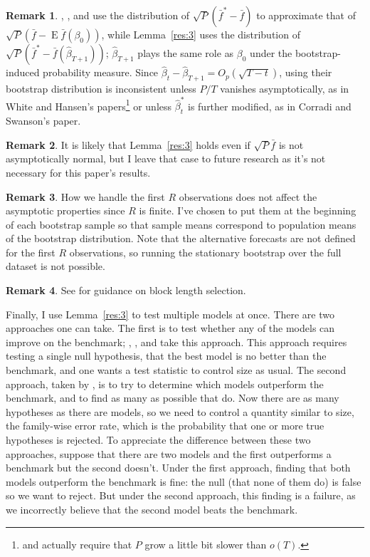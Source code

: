 \documentclass[12pt]{article}
\theoremstyle{definition}
\newtheorem{rem}{Remark}
\DeclareMathOperator{\E}{E}
\begin{document}
\begin{rem}
  \citet{Whi:00}, \citet{Han:05}, and \citet{CoS:07} use the
  distribution of $\sqrt{P}(\bar{f}^{*} - \bar{f})$ to approximate
  that of $\sqrt{P}(\bar{f} - \E \bar{f}(\beta_0))$, while
  Lemma~\ref{res:3} uses the distribution of $\sqrt{P}(\bar{f}^{*} -
  \bar{f}(\hat{\beta}_{T+1}))$; $\hat{\beta}_{T+1}$ plays the same
  role as $\beta_0$ under the bootstrap-induced probability measure.
  Since $\hat{\beta}_t - \hat{\beta}_{T+1} = O_p(\sqrt{T-t})$, using
  their bootstrap distribution is inconsistent unless $P/T$ vanishes
  asymptotically, as in White and Hansen's
  papers\footnote{\citet{Whi:00} and \citet{Han:05} actually require
    that $P$ grow a little bit slower than $o(T)$.} or unless
  $\hat{\beta}_t^{*}$ is further modified, as in Corradi and Swanson's
  paper.
\end{rem}

\begin{rem}
  It is likely that Lemma~\ref{res:3} holds even if $\sqrt{P} \bar{f}$
  is not asymptotically normal, but I leave that case to future
  research as it's not necessary for this paper's results.
\end{rem}

\begin{rem}
  How we handle the first $R$ observations does not affect the
  asymptotic properties since $R$ is finite.  I've chosen to put them
  at the beginning of each bootstrap sample so that sample means
  correspond to population means of the bootstrap distribution.  Note
  that the alternative forecasts are not defined for the first $R$
  observations, so running the stationary bootstrap over the full
  dataset is not possible.
\end{rem}

\begin{rem}
  See \citet{RoW:05,RoW:06} for guidance on block length
  selection.
\end{rem}

Finally, I use Lemma~\ref{res:3} to test multiple models at once.
There are two approaches one can take.  The first is to test whether
any of the models can improve on the benchmark; \citet{Whi:00},
\citet{Han:05}, and \citet{ClM:11} take this approach.  This approach
requires testing a single null hypothesis, that the best model is no
better than the benchmark, and one wants a test statistic to control
size as usual.  The second approach, taken by \citet{RoW:05}, is to
try to determine which models outperform the benchmark, and to find as
many as possible that do.  Now there are as many hypotheses as there
are models, so we need to control a quantity similar to size, the
family-wise error rate, which is the probability that one or more true
hypotheses is rejected.  To appreciate the difference between these
two approaches, suppose that there are two models and the first
outperforms a benchmark but the second doesn't.  Under the first
approach, finding that both models outperform the benchmark is fine:
the null (that none of them do) is false so we want to reject.  But
under the second approach, this finding is a failure, as we
incorrectly believe that the second model beats the benchmark.
\end{document}
